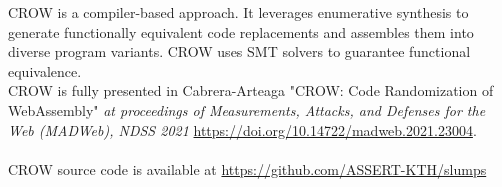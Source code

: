 

\begin{tcolorbox}[title=Contribution paper and artifact,boxrule=1pt,arc=.2em,boxsep=1.0mm]
    CROW is a compiler-based approach.
    It leverages enumerative synthesis to generate functionally equivalent code replacements and assembles them into diverse \wasm program variants. 
    CROW uses SMT solvers to guarantee functional equivalence. \\
    CROW is fully presented in Cabrera-Arteaga \etal "CROW: Code Randomization of WebAssembly"
    \emph{at proceedings of Measurements, Attacks, and Defenses for the Web (MADWeb), NDSS 2021}
    \url{https://doi.org/10.14722/madweb.2021.23004}. 
    \\\\
    CROW source code is available at \url{https://github.com/ASSERT-KTH/slumps}

\end{tcolorbox}

